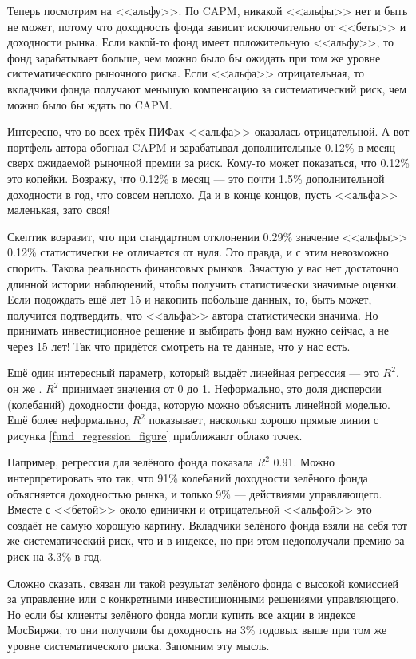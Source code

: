 Теперь посмотрим на <<альфу>>. По CAPM, никакой <<альфы>> нет и быть не может, потому что доходность фонда зависит исключительно от <<беты>> и доходности рынка. Если какой-то фонд имеет положительную <<альфу>>, то фонд зарабатывает больше, чем можно было бы ожидать при том же уровне систематического рыночного риска. Если <<альфа>> отрицательная, то вкладчики фонда получают меньшую компенсацию за систематический риск, чем можно было бы ждать по CAPM.

Интересно, что во всех трёх ПИФах <<альфа>> оказалась отрицательной. А вот портфель автора обогнал CAPM и зарабатывал дополнительные 0.12\% в месяц сверх ожидаемой рыночной премии за риск. Кому-то может показаться, что 0.12\% это копейки. Возражу, что 0.12\% в месяц --- это почти 1.5\% дополнительной доходности в год, что совсем неплохо. Да и в конце концов, пусть <<альфа>> маленькая, зато своя!

Скептик возразит, что при стандартном отклонении 0.29\% значение <<альфы>> 0.12\% статистически не отличается от нуля. Это правда, и с этим невозможно спорить. Такова реальность финансовых рынков. Зачастую у вас нет достаточно длинной истории наблюдений, чтобы получить статистически значимые оценки. Если подождать ещё лет 15 и накопить побольше данных, то, быть может, получится подтвердить, что <<альфа>> автора статистически значима. Но принимать инвестиционное решение и выбирать фонд вам нужно сейчас, а не через 15 лет! Так что придётся смотреть на те данные, что у нас есть.

Ещё один интересный параметр, который выдаёт линейная регрессия --- это $R^2$, он же . $R^2$ принимает значения от 0 до 1. Неформально, это доля дисперсии (колебаний) доходности фонда, которую можно объяснить линейной моделью. Ещё более неформально, $R^2$ показывает, насколько хорошо прямые линии с рисунка \ref{fund_regression_figure} приближают облако точек.

Например, регрессия для зелёного фонда показала $R^2$ 0.91. Можно интерпретировать это так, что 91\% колебаний доходности зелёного фонда объясняется доходностью рынка, и только 9\% --- действиями управляющего. Вместе с <<бетой>> около единички и отрицательной <<альфой>> это создаёт не самую хорошую картину. Вкладчики зелёного фонда взяли на себя тот же систематический риск, что и в индексе, но при этом недополучали премию за риск на 3.3\% в год. 

Сложно сказать, связан ли такой результат зелёного фонда с высокой комиссией за управление или с конкретными инвестиционными решениями управляющего. Но если бы клиенты зелёного фонда могли купить все акции в индексе МосБиржи, то они получили бы доходность на 3\% годовых выше при том же уровне систематического риска. Запомним эту мысль.

